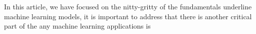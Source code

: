 In this article, we have focused on the nitty-gritty of the fundamentals underline machine learning models, it is important to address that there is another critical part of the any machine learning applications is